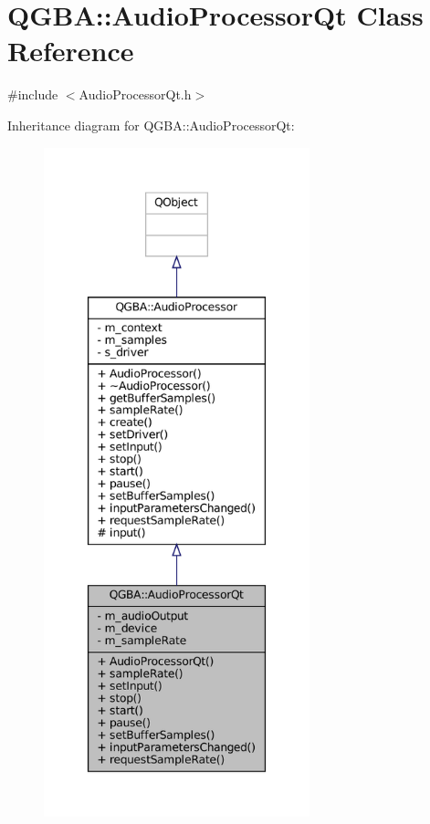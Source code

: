 \hypertarget{class_q_g_b_a_1_1_audio_processor_qt}{}\section{Q\+G\+BA\+:\+:Audio\+Processor\+Qt Class Reference}
\label{class_q_g_b_a_1_1_audio_processor_qt}


{\ttfamily \#include $<$Audio\+Processor\+Qt.\+h$>$}



Inheritance diagram for Q\+G\+BA\+:\+:Audio\+Processor\+Qt\+:
\nopagebreak
\begin{figure}[H]
\begin{center}
\leavevmode
\includegraphics[height=550pt]{class_q_g_b_a_1_1_audio_processor_qt__inherit__graph}
\end{center}
\end{figure}


